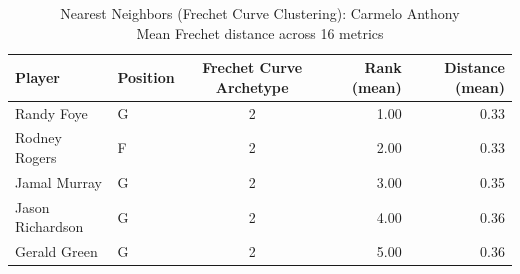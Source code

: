 \begin{table}[t]
\caption*{
{\fontsize{20}{25} Nearest Neighbors (Frechet Curve Clustering): Carmelo Anthony\fontsize{12}{15}\selectfont } \\ 
{\fontsize{14}{17}\selectfont  Mean Frechet distance across 16 metrics\fontsize{12}{15}\selectfont }
} 
\fontsize{12.0pt}{14.0pt}\selectfont
\begin{tabular*}{\linewidth}{@{\extracolsep{\fill}}llcrr}
\toprule
Player & Position & Frechet Curve Archetype & Rank (mean) & Distance (mean) \\ 
\midrule\addlinespace[2.5pt]
Randy Foye & G & 2 & 1.00 & 0.33 \\ 
Rodney Rogers & F & 2 & 2.00 & 0.33 \\ 
Jamal Murray & G & 2 & 3.00 & 0.35 \\ 
Jason Richardson & G & 2 & 4.00 & 0.36 \\ 
Gerald Green & G & 2 & 5.00 & 0.36 \\ 
\bottomrule
\end{tabular*}
\end{table}

